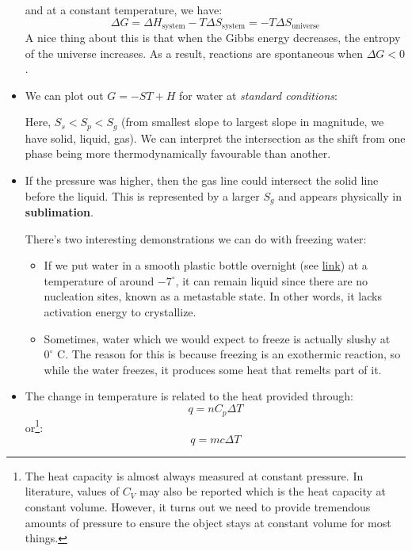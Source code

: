 \begin{itemize}
\begin{equation}
    \end{equation}
    and at a constant temperature, we have:
    \begin{equation}
        \Delta G = \Delta H_\text{system} - T\Delta S_\text{system} =  -T\Delta S_\text{universe}
    \end{equation}
    A nice thing about this is that when the Gibbs energy decreases, the entropy of the universe increases. As a result, reactions are spontaneous when $\Delta G < 0$.
    \item We can plot out $G = -ST + H$ for water at \textit{standard conditions}:
    \begin{center}
    \end{center}
    Here, $S_s < S_p < S_g$ (from smallest slope to largest slope in magnitude, we have solid, liquid, gas). We can interpret the intersection as the shift from one phase being more thermodynamically favourable than another. 
    \item If the pressure was higher, then the gas line could intersect the solid line before the liquid. This is represented by a larger $S_g$ and appears physically in \textbf{sublimation}.
    \begin{case}
        There's two interesting demonstrations we can do with freezing water:
        \begin{itemize}
            \item If we put water in a smooth plastic bottle overnight (see \href{https://www.youtube.com/watch?v=ph8xusY3GTM}{link}) at a temperature of around $-7^\circ$, it can remain liquid since there are no nucleation sites, known as a metastable state. In other words, it lacks activation energy to crystallize.
            \item Sometimes, water which we would expect to freeze is actually slushy at $0^\circ\text{ C}$. The reason for this is because freezing is an exothermic reaction, so while the water freezes, it produces some heat that remelts part of it.
        \end{itemize}
    \end{case}
    \item The change in temperature is related to the heat provided through:
    \begin{equation}
        q = nC_p\Delta T
    \end{equation}
    or\footnote{The heat capacity is almost always measured at constant pressure. In literature, values of $C_V$ may also be reported which is the heat capacity at constant volume. However, it turns out we need to provide tremendous amounts of pressure to ensure the object stays at constant volume for most things.}:
    \begin{equation}
        q = mc\Delta T
    \end{equation}
\end{itemize}